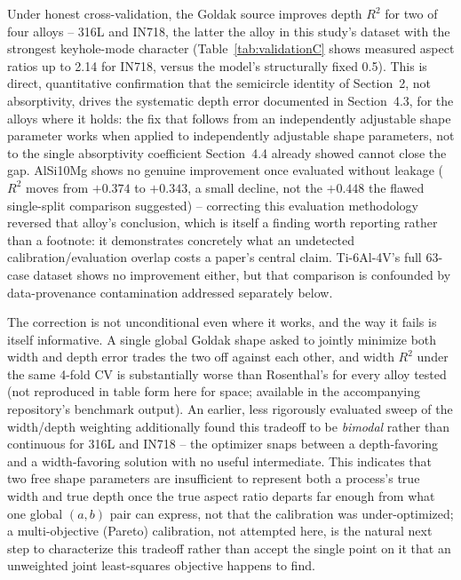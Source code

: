 \documentclass[12pt]{article}
\begin{document}
Under honest cross-validation, the Goldak source improves depth $R^2$ for two of four alloys -- 316L and IN718, the latter the alloy in this study's dataset with the strongest keyhole-mode character (Table~\ref{tab:validationC} shows measured aspect ratios up to 2.14 for IN718, versus the model's structurally fixed 0.5). This is direct, quantitative confirmation that the semicircle identity of Section~2, not absorptivity, drives the systematic depth error documented in Section~4.3, for the alloys where it holds: the fix that follows from an independently adjustable shape parameter works when applied to independently adjustable shape parameters, not to the single absorptivity coefficient Section~4.4 already showed cannot close the gap. AlSi10Mg shows no genuine improvement once evaluated without leakage ($R^2$ moves from $+0.374$ to $+0.343$, a small decline, not the $+0.448$ the flawed single-split comparison suggested) -- correcting this evaluation methodology reversed that alloy's conclusion, which is itself a finding worth reporting rather than a footnote: it demonstrates concretely what an undetected calibration/evaluation overlap costs a paper's central claim. Ti-6Al-4V's full 63-case dataset shows no improvement either, but that comparison is confounded by data-provenance contamination addressed separately below.

The correction is not unconditional even where it works, and the way it fails is itself informative. A single global Goldak shape asked to jointly minimize both width and depth error trades the two off against each other, and width $R^2$ under the same 4-fold CV is substantially worse than Rosenthal's for every alloy tested (not reproduced in table form here for space; available in the accompanying repository's benchmark output). An earlier, less rigorously evaluated sweep of the width/depth weighting additionally found this tradeoff to be \emph{bimodal} rather than continuous for 316L and IN718 -- the optimizer snaps between a depth-favoring and a width-favoring solution with no useful intermediate. This indicates that two free shape parameters are insufficient to represent both a process's true width and true depth once the true aspect ratio departs far enough from what one global $(a,b)$ pair can express, not that the calibration was under-optimized; a multi-objective (Pareto) calibration, not attempted here, is the natural next step to characterize this tradeoff rather than accept the single point on it that an unweighted joint least-squares objective happens to find.
\end{document}
